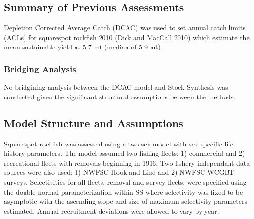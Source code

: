 \documentclass[11pt,
  english,
  a4paper,
]{article}
\begin{document}
\leavevmode\tagmcend\tagstructend


\hypertarget{summary-of-previous-assessments}{%
\subsection{Summary of Previous Assessments}\label{summary-of-previous-assessments}}

\leavevmode\tagmcend\tagstructend


Depletion Corrected Average Catch (DCAC) was used to set annual catch limits (ACLs) for squarespot rockfish 2010 {(Dick and MacCall 2010)\leavevmode\tagmcend\tagstructend} which estimate the mean sustainable yield as 5.7 mt (median of 5.9 mt).

\leavevmode\tagmcend\tagstructend\par


\hypertarget{bridging-analysis}{%
\subsubsection{Bridging Analysis}\label{bridging-analysis}}

\leavevmode\tagmcend\tagstructend


No bridgining analysis between the DCAC model and Stock Synthesis was conducted given the significant structural assumptions between the methods.

\leavevmode\tagmcend\tagstructend\par


\hypertarget{model-structure-and-assumptions}{%
\subsection{Model Structure and Assumptions}\label{model-structure-and-assumptions}}

\leavevmode\tagmcend\tagstructend


Squarespot rockfish was assessed using a two-sex model with sex specific life history parameters. The model assumed two fishing fleets: 1) commercial and 2) recreational fleets with removals beginning in 1916. Two fishery-independant data sources were also used: 1) NWFSC Hook and Line and 2) NWFSC WCGBT surveys. Selectivities for all fleets, removal and survey fleets, were specified using the double normal parameterization within SS where selectivity was fixed to be asymptotic with the ascending slope and size of maximum selectivity parameters estimated. Annual recruitment deviations were allowed to vary by year.
\end{document}

